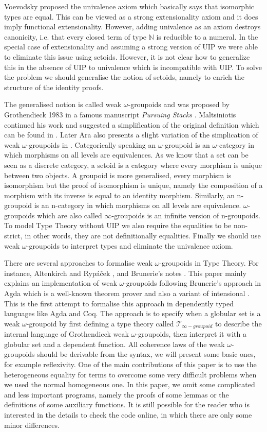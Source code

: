 \documentclass{acm_proc_article-sp}
\newcommand{\og}{$\omega$-groupoids}
\newcommand{\wog}{weak $\omega$-groupoids}
\newcommand{\wogs}{weak $\omega$-groupoid} %
\newcommand{\tig}{$\mathcal{T}_{\infty-groupoid}$}
\begin{document}
Voevodsky proposed the univalence axiom which basically says that
isomorphic types are equal. This can be viewed as a strong
extensionality axiom and it does imply functional extensionality.
However, adding
univalence as an axiom destroys canonicity, i.e. that every closed
term of type $\mathbb{N}$ is reducible to a numeral. In the special case of
extensionality and assuming a strong version of UIP we were able to
eliminate this issue \cite{alti:lics99,alti:ott-conf} using
setoids. However, it is not clear how to generalize this in the
absence of UIP to
univalence which is incompatible with UIP.  To solve the problem we
should generalise the notion of setoids, namely to enrich the
structure of the identity proofs.


The generalised notion is called {\wog} and was proposed by
Grothendieck 1983 in a famous manuscript \emph{Pursuing Stacks} \cite{gro:ps}. Maltsiniotis continued his work and suggested a simplification of the original definition which can be found in \cite{mal:gwog}. Later Ara also presents a slight variation of the simplication of {\wog} in \cite{ara:wog}. Categorically speaking an $\omega$-groupoid is an $\omega$-category in which morphisms on all levels are equivalences. As we know that a set can be seen as a discrete
category, a setoid is a category where every morphism is unique between
two objects. A groupoid is more generalised, every morphism is
isomorphism but the proof of isomorphism is unique, namely the composition of a morphism with its inverse is equal to an identity morphism. Similarly, an
n-groupoid is an n-category in which morphisms on all levels are
equivalence. {\og} which are also called $\infty$-groupoids is an
infinite version of n-groupoids. To model Type Theory without UIP we
also require the equalities to be non-strict, in other words, they are
not definitionally equalities. Finally we should use {\wog} to interpret types and eliminate the univalence axiom.

There are several approaches to formalise {\wog} in Type Theory. For instance, Altenkirch and Ryp\'a\v{c}ek \cite{txa:csl}, and Brunerie's notes \cite{gb:wog}.
This paper mainly explains an implementation of {\wog} following Brunerie's approach in Agda which is a well-known theorem prover and also a variant of intensional {\mltt}. This is the first attempt to formalise this approach in dependently typed languages like Agda and Coq. The approach is to specify when a globular set is a {\wogs} by first defining a type theory called {\tig} to describe the internal language
of Grothendieck {\wog}, then interpret it with a globular set and a dependent function. All coherence laws of the {\wog} should be derivable from the syntax, we will present some basic ones, for example reflexivity. One of the main contributions of this paper is to use the heterogeneous equality for terms to overcome some very difficult problems when we used the normal homogeneous one. In this paper, we omit some complicated and less important programs, namely the proofs of some lemmas or the definitions of some auxiliary functions. It is still possible for the reader who is interested in the details to check the code online, in which there are only some minor differences.
\end{document}
